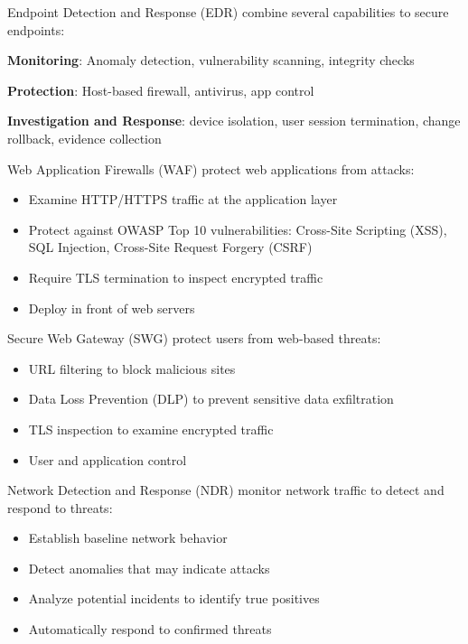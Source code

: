\begin{concept}{Endpoint Detection and Response (EDR)}
combine several capabilities to secure endpoints:

\textbf{Monitoring}:
    Anomaly detection, vulnerability scanning, integrity checks

    \textbf{Protection}:
    Host-based firewall, antivirus, app control

    \textbf{Investigation and Response}:
    device isolation, user session termination, change rollback, evidence collection
\end{concept}




\begin{definition}{Web Application Firewalls (WAF)}
protect web applications from attacks:
\begin{itemize}
    \item Examine HTTP/HTTPS traffic at the application layer
    \item Protect against OWASP Top 10 vulnerabilities:
    Cross-Site Scripting (XSS), SQL Injection, Cross-Site Request Forgery (CSRF)
    \item Require TLS termination to inspect encrypted traffic
    \item Deploy in front of web servers
\end{itemize}
\end{definition}




\begin{definition}{Secure Web Gateway (SWG)}
protect users from web-based threats:
\begin{itemize}
    \item URL filtering to block malicious sites
    \item Data Loss Prevention (DLP) to prevent sensitive data exfiltration
    \item TLS inspection to examine encrypted traffic
    \item User and application control
\end{itemize}
\end{definition}

\begin{definition}{Network Detection and Response (NDR)}
monitor network traffic to detect and respond to threats:
\begin{itemize}
    \item Establish baseline network behavior
    \item Detect anomalies that may indicate attacks
    \item Analyze potential incidents to identify true positives
    \item Automatically respond to confirmed threats
\end{itemize}
\end{definition}

